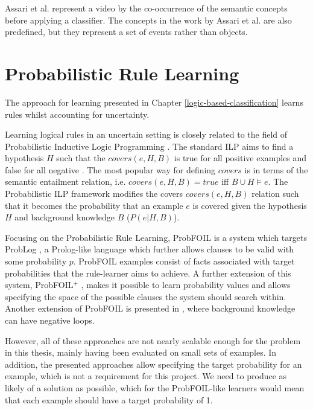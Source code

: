 Assari et al. \cite{RefWorks:RefID:52-assari2014video} represent a video by the co-occurrence of the semantic concepts before applying a classifier.
The concepts in the work by Assari et al. are also predefined, but they represent a set of events rather than objects.


\section{Probabilistic Rule Learning}
\label{probabilistic-rule-learning}

The approach for learning presented in Chapter \ref{logic-based-classification} learns rules whilst accounting for uncertainty.

Learning logical rules in an uncertain setting is closely related to the field of Probabilistic Inductive Logic Programming \cite{RefWorks:RefID:73-raedt2008probabilistic}.
The standard ILP aims to find a hypothesis $H$ such that the $covers(e, H, B)$ is true for all positive examples and false for all negative \cite{RefWorks:RefID:76-de2010inductive}.
The most popular way for defining $covers$ is in terms of the semantic entailment relation, i.e. $covers(e, H, B) = true$ iff $B \cup H \vDash e$.
The Probabilistic ILP framework modifies the covers $covers(e, H, B)$ relation such that it becomes the probability that an example $e$ is covered given the hypothesis $H$ and background knowledge $B$ ($P(e | H, B)$).

Focusing on the Probabilistic Rule Learning, ProbFOIL \cite{RefWorks:RefID:77-raedt2010probabilistic} is a system which targets ProbLog \cite{RefWorks:RefID:77-raedt2010probabilistic}, a Prolog-like language which further allows clauses to be valid with some probability $p$.
ProbFOIL examples consist of facts associated with target probabilities that the rule-learner aims to achieve.
A further extension of this system, ProbFOIL$^+$ \cite{RefWorks:RefID:78-de2015inducing}, makes it possible to learn probability values and allows specifying the space of the possible clauses the system should search within.
Another extension of ProbFOIL is presented in \cite{RefWorks:RefID:79-tuckey2020structure}, where background knowledge can have negative loops.

However, all of these approaches are not nearly scalable enough for the problem in this thesis, mainly having been evaluated on small sets of examples.
In addition, the presented approaches allow specifying the target probability for an example, which is not a requirement for this project.
We need to produce as likely of a solution as possible, which for the ProbFOIL-like learners would mean that each example should have a target probability of 1.


